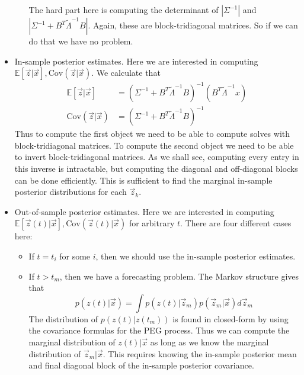 \documentclass{article}
\theoremstyle{definition}
\newcommand{\Cov}{\mathrm{Cov}}
\begin{document}
\begin{itemize}
\begin{itemize}
\[\]
The hard part here is computing the determinant of $\left|\Sigma^{-1}\right|$
and $\left|\Sigma^{-1}+B^{T}\tilde{\Lambda}^{-1}B\right|$. Again,
these are block-tridiagonal matrices. So if we can do that we have
no problem.
\end{itemize}
\item In-sample posterior estimates. Here we are interested in computing
$\mathbb{E}\left[\vec{z}|\vec{x}\right],\Cov\left(\vec{z}|\vec{x}\right)$.
We calculate that 
\begin{align*}
\mathbb{E}\left[\vec{z}|\vec{x}\right] & =\left(\Sigma^{-1}+B^{T}\tilde{\Lambda}^{-1}B\right)^{-1}\left(B^{T}\tilde{\Lambda}^{-1}x\right)\\
\Cov\left(\vec{z}|\vec{x}\right) & =\left(\Sigma^{-1}+B^{T}\tilde{\Lambda}^{-1}B\right)^{-1}
\end{align*}
Thus to compute the first object we need to be able to compute solves
with block-tridiagonal matrices. To compute the second object we need
to be able to invert block-tridiagonal matrices.  As we shall see, computing every entry in this inverse is intractable, but computing the diagonal and off-diagonal blocks can be done efficiently.  This is sufficient to find the marginal in-sample posterior distributions for each $\vec z_k$.

\item Out-of-sample posterior estimates. Here we are interested in computing
$\mathbb{E}\left[\vec{z}(t)|\vec{x}\right],\Cov\left(\vec{z}(t)|\vec{x}\right)$
for arbitrary $t$. There are four different cases here:
\begin{itemize}
\item If $t=t_{i}$ for some $i$, then we should use the in-sample posterior
estimates.
\item If $t>t_{m}$, then we have a forecasting problem. The Markov structure
gives that 
\[
p(z(t)|\vec x) = \int p(z(t)|\vec z_m) p(\vec z_m |\vec x) d \vec z_m 
\]
The distribution of $p(z(t)|z(t_m))$ is found in closed-form by using the covariance formulas for the PEG process.  Thus we can compute the marginal distribution of $z(t)|\vec x$ as long as we know the marginal distribution of $\vec z_m|\vec x$.  This requires knowing the in-sample posterior mean and final diagonal block of the in-sample posterior covariance.


\end{itemize}
\end{itemize}
\end{document}
